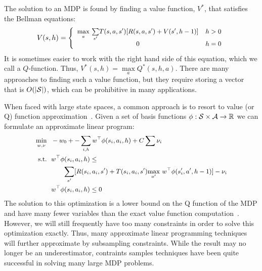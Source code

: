 The solution to an MDP is found by finding a value function, $V^*$, that satisfies the Bellman equations:
$${\footnotesize V(s, h) = \left\{ \begin{array}{cl} \underset{a}{\max}\ \underset{s'}{\sum} T(s, a, s')[R(s, a, s') + V(s', h-1)] & h >0 \\ 0 & h = 0\end{array}\right.}$$
It is sometimes easier to work with the right hand side of this equation, which we call a $Q$-function. Thus, $V^*(s, h) = \underset{a}{\max}Q^*(s, h, a)$.
There are many approaches to finding such a value function, but they require storing a vector that is $O(|\mathcal{S}{}|)$, which can be prohibitive in many applications. 


When faced with large state spaces, a common approach is to resort to value (or Q) function approximation~\cite{schweitzer1985generalized}. 
Given a set of basis functions $\phi: \mathcal{S}{}\times \mathcal{A}{} \rightarrow \mathbb{R}$ we can formulate an approximate linear program:
\begin{equation}
{\footnotesize
\begin{aligned}
\underset{w, \nu}{\min}\ \    &-w_0 + -\sum_{i, h} w^\top \phi(s_i, a_i, h) + C\sum \nu_i\\
\text{s.t.}\ \   &w^\top \phi(\statevar{}_i, \actionvar{}_i, h) \leq \\ &\ \ \ \ \ \ \underset{s'}{\sum}[R(s_i, a_i, s') + T(s_i, a_i, s')\underset{a'}{\max}\ w^\top \phi(\statevar{}'_i, \actionvar{}', h-1)] -  \nu_i \\
&w^\top \phi(\statevar{}_i, \actionvar{}_i, h) \leq 0
\end{aligned}}
\end{equation}
The solution to this optimization is a lower bound on the Q function of the MDP and have many fewer variables than the exact value function computation~\cite{puterman1994}.
However, we will still frequently have too many constraints in order to solve this optimization exactly.
Thus, many approximate linear programming techniques will further approximate by subsampling constraints.
While the result may no longer be an underestimator, contraints samples techniques have been quite successful in solving many large MDP problems.


